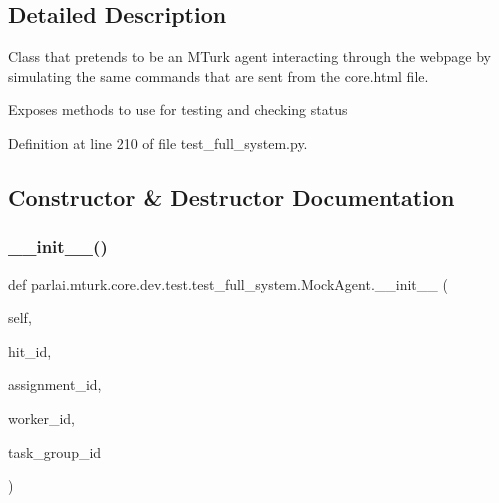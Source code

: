 \subsection{Detailed Description}
\begin{DoxyVerb}Class that pretends to be an MTurk agent interacting through the webpage by
simulating the same commands that are sent from the core.html file.

Exposes methods to use for testing and checking status
\end{DoxyVerb}
 

Definition at line 210 of file test\+\_\+full\+\_\+system.\+py.



\subsection{Constructor \& Destructor Documentation}
\mbox{\label{classparlai_1_1mturk_1_1core_1_1dev_1_1test_1_1test__full__system_1_1MockAgent_ae2c5906fb77600feb2d4c8d1ede4e415}} 
\subsubsection{\texorpdfstring{\+\_\+\+\_\+init\+\_\+\+\_\+()}{\_\_init\_\_()}}
{\footnotesize\ttfamily def parlai.\+mturk.\+core.\+dev.\+test.\+test\+\_\+full\+\_\+system.\+Mock\+Agent.\+\_\+\+\_\+init\+\_\+\+\_\+ (\begin{DoxyParamCaption}\item[{}]{self,  }\item[{}]{hit\+\_\+id,  }\item[{}]{assignment\+\_\+id,  }\item[{}]{worker\+\_\+id,  }\item[{}]{task\+\_\+group\+\_\+id }\end{DoxyParamCaption})}



